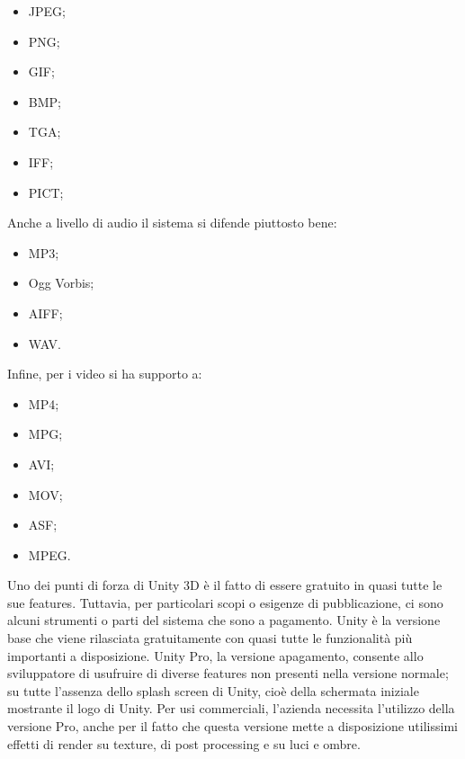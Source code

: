 \begin{multicols}{3}
	\begin{itemize}
	\item JPEG;
	\item PNG;
	\item GIF;
	\item BMP;
	\item TGA;
	\item IFF;
	\item PICT;
\end{itemize}
\end{multicols}

Anche a livello di audio il sistema si difende piuttosto bene: 
\begin{multicols}{2}
	\begin{itemize}
		\item MP3;
		\item Ogg Vorbis;
		\item AIFF;
		\item WAV.
	\end{itemize}
\end{multicols}

Infine, per i video si ha supporto a:
\begin{multicols}{3}
	\begin{itemize}
		\item MP4;
		\item MPG;
		\item AVI;
		\item MOV;
		\item ASF;
		\item MPEG.
	\end{itemize}
\end{multicols}

Uno dei punti di forza di Unity 3D \`e il fatto di essere gratuito in quasi tutte le sue features. Tuttavia,
per particolari scopi o esigenze di pubblicazione, ci sono alcuni strumenti o parti del sistema che sono a pagamento. Unity \`e la versione base che viene rilasciata gratuitamente con quasi tutte le funzionalit\`a pi\`u importanti a disposizione. Unity Pro, la versione apagamento, consente allo sviluppatore di usufruire di diverse features non presenti nella versione normale; su tutte l'assenza dello splash screen di Unity, cio\`e della schermata iniziale mostrante il logo di Unity.
Per usi commerciali, l'azienda necessita l'utilizzo della versione Pro, anche per il fatto che questa versione mette a disposizione utilissimi effetti di render su texture, di post processing e su luci e ombre.
\\

